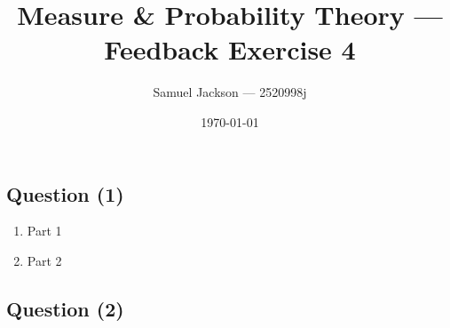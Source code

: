 \documentclass{article}
\title{Measure \& Probability Theory  --- Feedback Exercise 4}
\author{Samuel Jackson --- 2520998j}
\date{\today}
\begin{document}
\maketitle

\newcommand{\N}{\mathbb{N}}
\newcommand{\R}{\mathbb{R}}
\newcommand{\Z}{\mathbb{Z}}
\newcommand{\Q}{\mathbb{Q}}
\newcommand{\I}{\mathbb{I}}

\newcommand{\A}{\mathcal{A}}
\newcommand{\C}{\mathcal{C}}

\newcommand{\halfopen}[2]{\, [\frac{#1}{100},\frac{#2}{100}) \,}
\newcommand{\borel}{\mathcal{B}(\mathbb{R})}
\newcommand{\powerX}{\mathcal{P}(X)}
\newcommand{\infcup}{\bigcup_{j=0}^\infty}
\newcommand{\infsum}{\sum_{j=0}^\infty}

\newcommand{\salgebra}{\sigma\text{-algebra}}
\newcommand{\outerset}{\mathcal{M}_{\outermu}}
\newcommand{\outermu}{\mu^\ast}
\newcommand{\outerlamb}{\lambda^\ast}

\newcommand{\invf}{f^{-1}}
\newcommand{\invh}{h^{-1}}
\newcommand{\invg}{g^{-1}}


\begin{center}
\section*{Question (1)}
\end{center}

\begin{enumerate}[label=(\roman*)]
    \item Part 1
    \item Part 2
\end{enumerate}
    

\begin{center}
\section*{Question (2)}
\end{center}
\end{document}
